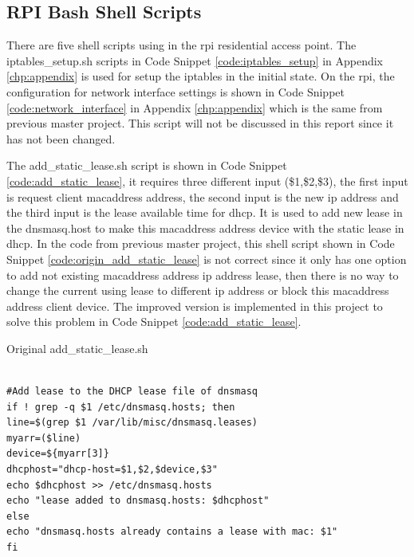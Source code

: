 \subsection{RPI Bash Shell Scripts}
\par There are five shell scripts using in the \gls{rpi} residential access point. The iptables\_setup.sh scripts in Code Snippet \ref{code:iptables_setup} in Appendix \ref{chp:appendix} is used for setup the iptables in the initial state. On the \gls{rpi}, the configuration for network interface settings is shown in Code Snippet \ref{code:network_interface} in Appendix \ref{chp:appendix} which is the same from previous master project. This script will not be discussed in this report since it has not been changed.
\par The add\_static\_lease.sh script is shown in Code Snippet \ref{code:add_static_lease}, it requires three different input (\$1,\$2,\$3), the first input is request client \gls{macaddress} address, the second input is the new \gls{ip} address and the third input is the lease available time for \gls{dhcp}. It is used to add new lease in the dnsmasq.host to make this \gls{macaddress} address device with the static lease in \gls{dhcp}. In the code from previous master project, this shell script shown in Code Snippet \ref{code:origin_add_static_lease} is not correct since it only has one option to add not existing \gls{macaddress} address \gls{ip} address lease, then there is no way to change the current using lease to different \gls{ip} address or block this \gls{macaddress} address client device. The improved version is implemented in this project to solve this problem in Code Snippet \ref{code:add_static_lease}.

\begin{algorithm}[h]
  \caption{Original add\_static\_lease.sh}
  \label{code:origin_add_static_lease}
  \begin{verbatim}
  
#Add lease to the DHCP lease file of dnsmasq
if ! grep -q $1 /etc/dnsmasq.hosts; then
line=$(grep $1 /var/lib/misc/dnsmasq.leases)
myarr=($line)
device=${myarr[3]}
dhcphost="dhcp-host=$1,$2,$device,$3"
echo $dhcphost >> /etc/dnsmasq.hosts
echo "lease added to dnsmasq.hosts: $dhcphost"
else
echo "dnsmasq.hosts already contains a lease with mac: $1"
fi
 \end{verbatim}
\end{algorithm}

